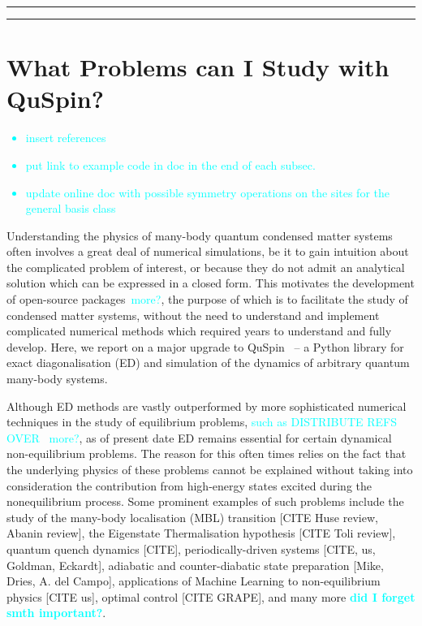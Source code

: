 \documentclass{SciPost}
\newcommand\0{\scalebox{-1}[1]{0}}
\newcommand*{\cyan}{\textcolor{cyan}}
\begin{document}
\vspace{10pt}
\noindent\rule{\textwidth}{1pt}
\tableofcontents\thispagestyle{fancy}
\noindent\rule{\textwidth}{1pt}
\vspace{10pt}


\section{What Problems can I Study with QuSpin?}
\label{sec:intro}

\cyan{
\begin{itemize}
		\item insert references
		\item put link to example code in doc in the end of each subsec.
		\item update online doc with possible symmetry operations on the sites for the general basis class 	
\end{itemize}
	}

Understanding the physics of many-body quantum condensed matter systems often involves a great deal of numerical simulations, be it to gain intuition about the complicated problem of interest, or because they do not admit an analytical solution which can be expressed in a closed form. This motivates the development of open-source packages~\cite{alet05,albuquerque2007,bauer11,dolfi14,ITensor,TNT,johansson2012,johansson2013,wright_13}\cyan{more?}, the purpose of which is to facilitate the study of condensed matter systems, without the need to understand and implement complicated numerical methods which required years to understand and fully develop. Here, we report on a major upgrade to QuSpin~\cite{weinberg_17_quspin} -- a Python library for exact diagonalisation (ED) and simulation of the dynamics of arbitrary quantum many-body systems. 

Although ED methods are vastly outperformed by more sophisticated numerical techniques in the study of equilibrium problems, \cyan{such as DISTRIBUTE REFS OVER} ~\cite{pollet_12,foulkes_01,acioli_97,daley_04,schollwock_05,schollwock_11,georges_96,kotliar_06,aoki_14}\cyan{more?}, as of present date ED remains essential for certain dynamical non-equilibrium problems. The reason for this often times relies on the fact that the underlying physics of these problems cannot be explained without taking into consideration the contribution from high-energy states excited during the nonequilibrium process. Some prominent examples of such problems include the study of the many-body localisation (MBL) transition [CITE Huse review, Abanin review], the Eigenstate Thermalisation hypothesis [CITE Toli review], quantum quench dynamics [CITE], periodically-driven systems [CITE, us, Goldman, Eckardt], adiabatic and counter-diabatic state preparation [Mike, Dries, A. del Campo], applications of Machine Learning to non-equilibrium physics [CITE us], optimal control [CITE GRAPE], and many more \cyan{\bf did I forget smth important?}.
\end{document}
